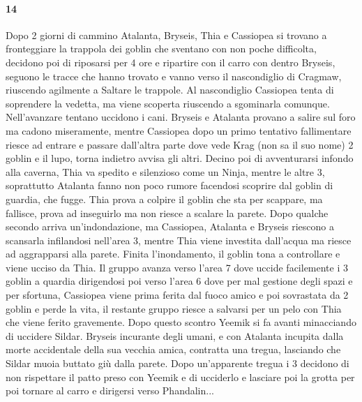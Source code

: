 \documentclass{article}
\begin{document}
                      \paragraph{14}
    Dopo 2 giorni di cammino Atalanta, Bryseis, Thia e Cassiopea si trovano a fronteggiare la trappola dei goblin che sventano con non poche difficolta, decidono poi di riposarsi per 4 ore e ripartire con il carro con dentro Bryseis, seguono le tracce che hanno trovato e vanno verso il nascondiglio di Cragmaw, riuscendo agilmente a Saltare le trappole. Al nascondiglio Cassiopea tenta di soprendere la vedetta, ma viene scoperta riuscendo a sgominarla comunque. Nell'avanzare tentano uccidono i cani. Bryseis e Atalanta provano a salire sul foro ma cadono miseramente, mentre Cassiopea dopo un primo tentativo fallimentare riesce ad entrare e passare dall'altra parte dove vede Krag (non sa il suo nome) 2 goblin e il lupo, torna indietro avvisa gli altri. Decino poi di avventurarsi infondo alla caverna, Thia va spedito e silenzioso come un Ninja, mentre le altre 3, soprattutto Atalanta fanno non poco rumore facendosi scoprire dal goblin di guardia, che fugge. Thia prova a colpire il goblin che sta per scappare, ma fallisce, prova ad inseguirlo ma non riesce a scalare la parete. Dopo qualche secondo arriva un'indondazione, ma Cassiopea, Atalanta e Bryseis riescono a scansarla infilandosi nell'area 3, mentre Thia viene investita dall'acqua ma riesce ad aggrapparsi alla parete. Finita l'inondamento, il goblin tona a controllare e viene ucciso da Thia. Il gruppo avanza verso l'area 7 dove uccide facilemente i 3 goblin a quardia dirigendosi poi verso l'area 6 dove per mal gestione degli spazi e per sfortuna, Cassiopea viene prima ferita dal fuoco amico e poi sovrastata da 2 goblin e perde la vita, il restante gruppo riesce a salvarsi per un pelo con Thia che viene ferito gravemente. Dopo questo scontro Yeemik si fa avanti minacciando di uccidere Sildar. Bryseis incurante degli umani, e con Atalanta incupita dalla morte accidentale della sua vecchia amica, contratta una tregua, lasciando che Sildar muoia buttato giù dalla parete. Dopo un'apparente tregua i 3 decidono di non rispettare il patto preso con Yeemik e di ucciderlo e lasciare poi la grotta per poi tornare al carro e dirigersi verso Phandalin...  
\end{document}
